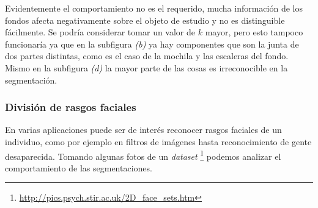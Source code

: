 \indent Evidentemente el comportamiento no es el requerido, mucha informaci\'on de los fondos afecta negativamente sobre el objeto de estudio y no es distinguible fácilmente. Se podr\'ia considerar tomar un valor de $k$ mayor, pero esto tampoco funcionar\'ia ya que en la subfigura \textit{(b)} ya hay componentes que son la junta de dos partes distintas, como es el caso de la mochila y las escaleras del fondo. Mismo en la subfigura \textit{(d)} la mayor parte de las cosas es irreconocible en la segmentaci\'on.

\subsubsection{Divisi\'on de rasgos faciales}
En varias aplicaciones puede ser de interés reconocer rasgos faciales de un individuo, como por ejemplo en filtros de im\'agenes hasta reconocimiento de gente desaparecida. Tomando algunas fotos de un \textit{dataset} \footnote{\url{http://pics.psych.stir.ac.uk/2D_face_sets.htm}} podemos analizar el comportamiento de las segmentaciones.
\begin{figure}[H]
	\begin{center}
	\hspace{3mm}
	\caption{}
	\end{center}
\end{figure}
